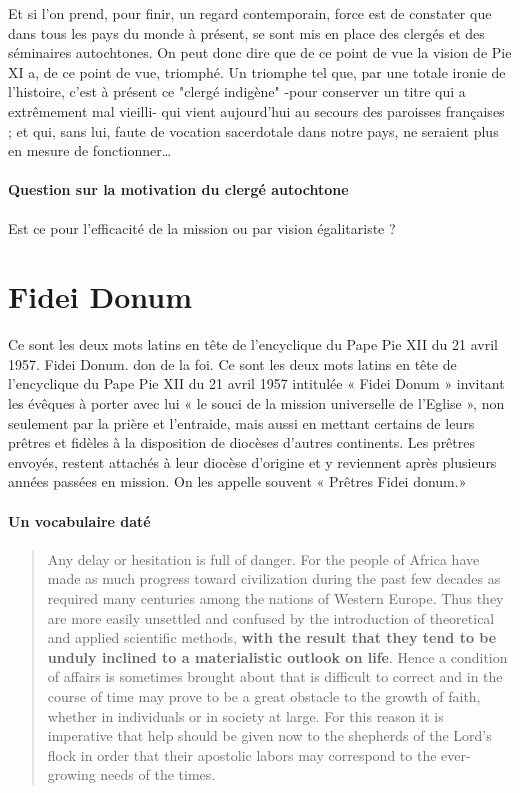 Et si l’on prend, pour finir, un regard contemporain, force est de constater que dans tous les pays du monde à présent, se sont mis en place des clergés et des séminaires autochtones. On peut donc dire que de ce point de vue la vision de Pie XI a, de ce point de vue, triomphé.  Un triomphe tel que, par une totale ironie de l’histoire, c’est à présent ce "clergé indigène" -pour conserver un titre qui a extrêmement mal vieilli- qui vient aujourd’hui au secours des paroisses françaises ; et qui, sans lui, faute de vocation sacerdotale dans notre pays, ne seraient plus en mesure de fonctionner…               
 

\paragraph{Question sur la motivation du clergé autochtone} Est ce pour l'efficacité de la mission ou par vision égalitariste ?


\section{Fidei Donum}
Ce sont les deux mots latins en tête de l'encyclique du Pape Pie XII du 21 avril 1957. Fidei Donum. don de la foi. Ce sont les deux mots latins en tête de l’encyclique du Pape Pie XII du 21 avril 1957 intitulée « Fidei Donum » invitant les évêques à porter avec lui « le souci de la mission universelle de l’Eglise », non seulement par la prière et l’entraide, mais aussi en mettant certains de leurs prêtres et fidèles à la disposition de diocèses d’autres continents. Les prêtres envoyés, restent attachés à leur diocèse d’origine et y reviennent après plusieurs années passées en mission. On les appelle souvent « Prêtres Fidei donum.»

\paragraph{Un vocabulaire daté}
\begin{quote}
    Any delay or hesitation is full of danger. For the people of Africa have made as much progress toward civilization during the past few decades as required many centuries among the nations of Western Europe. Thus they are more easily unsettled and confused by the introduction of theoretical and applied scientific methods, \textbf{with the result that they tend to be unduly inclined to a materialistic outlook on life}. Hence a condition of affairs is sometimes brought about that is difficult to correct and in the course of time may prove to be a great obstacle to the growth of faith, whether in individuals or in society at large. For this reason it is imperative that help should be given now to the shepherds of the Lord's flock in order that their apostolic labors may correspond to the ever-growing needs of the times.
\end{quote}


